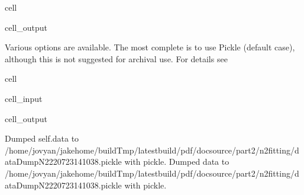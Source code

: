 \documentclass[letterpaper,table,10pt,english]{jupyterBook}
\begin{document}
\begin{sphinxuseclass}{cell}
\begin{sphinxVerbatimOutput}
\begin{sphinxuseclass}{cell_output}
\end{sphinxuseclass}\end{sphinxVerbatimOutput}

\end{sphinxuseclass}
\sphinxAtStartPar
{}

\sphinxAtStartPar
Various options are available. The most complete is to use Pickle (default case), although this is not suggested for archival use. For details see 

\begin{sphinxuseclass}{cell}\begin{sphinxVerbatimInput}

\begin{sphinxuseclass}{cell_input}
\begin{sphinxVerbatim}[commandchars=\\\{\}]
    

     
\end{sphinxVerbatim}

\end{sphinxuseclass}\end{sphinxVerbatimInput}
\begin{sphinxVerbatimOutput}

\begin{sphinxuseclass}{cell_output}
\begin{sphinxVerbatim}[commandchars=\\\{\}]
Dumped self.data to /home/jovyan/jake\PYGZhy{}home/buildTmp/\PYGZus{}latest\PYGZus{}build/pdf/doc\PYGZhy{}source/part2/n2fitting/dataDump\PYGZus{}N2\PYGZus{}220723\PYGZus{}14\PYGZhy{}10\PYGZhy{}38.pickle with pickle.
Dumped data to /home/jovyan/jake\PYGZhy{}home/buildTmp/\PYGZus{}latest\PYGZus{}build/pdf/doc\PYGZhy{}source/part2/n2fitting/dataDump\PYGZus{}N2\PYGZus{}220723\PYGZus{}14\PYGZhy{}10\PYGZhy{}38.pickle with pickle.
\end{sphinxVerbatim}


\end{sphinxuseclass}
\end{sphinxVerbatimOutput}
\end{sphinxuseclass}
\end{document}
